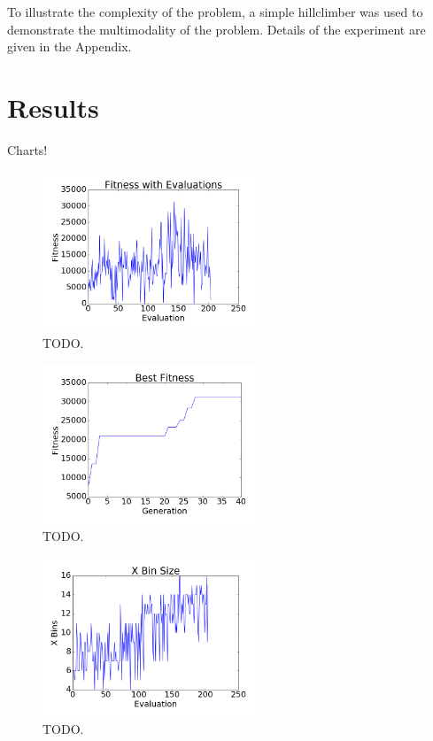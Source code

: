 \documentclass[conference]{IEEEtran}
\begin{document}
To illustrate the complexity of the problem, a simple hillclimber was used to demonstrate the multimodality of the problem. Details of the experiment are given in the Appendix.


\section{Results}
Charts!

\begin{figure}[!t]
\centering
\includegraphics[width=2.5in]{fitnessplot}
\caption{TODO.}
\label{fig:fitness}
\end{figure}

\begin{figure}[!t]
\centering
\includegraphics[width=2.5in]{bestfitever}
\caption{TODO.}
\label{fig:bestfitness}
\end{figure}

\begin{figure}[!t]
\centering
\includegraphics[width=2.5in]{xbinsize}
\caption{TODO.}
\label{fig:xbinsize}
\end{figure}
\end{document}
